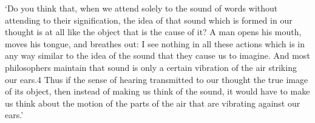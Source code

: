 \documentclass[12pt]{extarticle}
\begin{document}
\begin{multicols*}{3}
‘Do you think that, when we attend solely to the sound of words without attending to their
signification, the idea of that sound which is formed in our thought is at all like the object that
is the cause of it? A man opens his mouth, moves his tongue, and breathes out: I see nothing in all
these actions which is in any way similar to the idea of the sound that they cause us to imagine.
And most philosophers maintain that sound is only a certain vibration of the air striking our ears.4
Thus if the sense of hearing transmitted to our thought the true image of its object, then instead
of making us think of the sound, it would have to make us think about the motion of the parts of the
air that are vibrating against our ears.’
\citep[][p. 4--5 (AT 5)]{descartes:1998_world}
 



    
    







\footnotesize


\end{multicols*}
\end{document}
